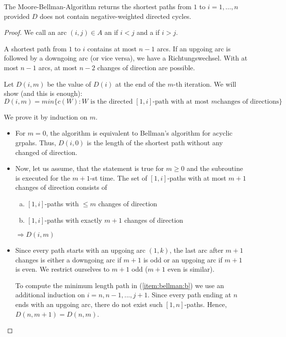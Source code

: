 \begin{thm} %
The Moore-Bellman-Algorithm returns the shortest paths from $1$ to $i = 1,
..., n$ provided $D$ does not contain negative-weighted directed cycles.
\end{thm}
\begin{proof}
We call an arc $(i, j) \in A$ an  if $i < j$ and a
 if $i > j$.

A shortest path from $1$ to $i$ contains at most $n-1$ arcs. If an upgoing
arc is followed by a downgoing arc (or vice versa), we have a  {Richtungswechsel}. With at most $n-1$ arcs, at most $n-2$
changes of direction are possible.

Let $D(i, m)$ be the value of $D(i)$ at the end of the $m$-th iteration.
We will show (and this is enough):
\[ D(i, m) = min \{ c(W): \textrm{$W$ is the directed $[1,i]$-path with at most $m$
changes of directions} \} \]

We prove it by induction on $m$.

\begin{itemize}
\item For $m = 0$, the algorithm is equivalent to Bellman's algorithm for acyclic
grpahs. Thus, $D(i, 0)$ is the length of the shortest path without any
changed of direction.

\item Now, let us assume, that the statement is true for $m \geq 0$ and the
subroutine is executed for the $m+1$-st time. The set of $[1,i]$-paths with
at most $m+1$ changes of direction consists of 
\begin{enumerate}[(a)]
\item\label{item:bellman:a} $[1,i]$-paths with $\leq m$ changes of direction
\item\label{item:bellman:b} $[1,i]$-paths with exactly $m+1$ changes of direction
\end{enumerate}
$\Rightarrow D(i, m)$

\item Since every path starts with an upgoing arc $(1, k)$, the last arc
after $m+1$ changes is either a downgoing arc if $m+1$ is odd or an upgoing
arc if $m+1$ is even. We restrict ourselves to $m+1$ odd ($m+1$ even is
similar).

To compute the minimum length path in (\ref{item:bellman:b}) we use an
additional induction on $i= n, n-1, ..., j+1$. Since every path ending at
$n$ ends with an upgoing arc, there do not exist such $[1,n]$-paths.
Hence, $D(n, m+1) = D(n, m)$.


\end{itemize}
\end{proof}
